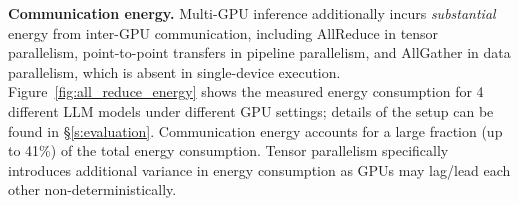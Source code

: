 \noindent\textbf{Communication energy.}
Multi-GPU inference additionally incurs \emph{substantial} energy from inter-GPU communication, including AllReduce in tensor parallelism, point-to-point transfers in pipeline parallelism, and AllGather in data parallelism, which is absent in single-device execution.
Figure~\ref{fig:all_reduce_energy} shows the measured energy consumption for 4 different LLM models under different GPU settings;
details of the setup can be found in \S\ref{s:evaluation}. 
 Communication energy accounts for a large fraction (up to 41\%) of the total energy consumption.
Tensor parallelism specifically introduces additional variance in energy consumption as
GPUs may lag/lead each other non-deterministically.


